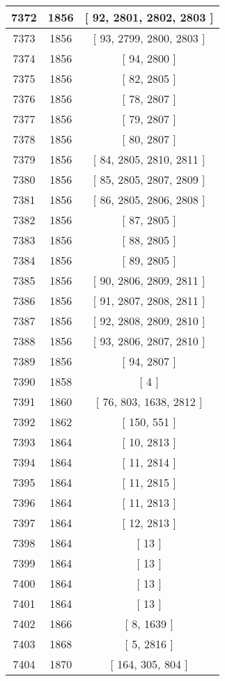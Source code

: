 \begin{center}
\begin{longtable}[H]{|| c c c ||}
\hline
7372 & 1856 & [ 92, 2801, 2802, 2803 ] \\ 
\hline
7373 & 1856 & [ 93, 2799, 2800, 2803 ] \\ 
\hline
7374 & 1856 & [ 94, 2800 ] \\ 
\hline
7375 & 1856 & [ 82, 2805 ] \\ 
\hline
7376 & 1856 & [ 78, 2807 ] \\ 
\hline
7377 & 1856 & [ 79, 2807 ] \\ 
\hline
7378 & 1856 & [ 80, 2807 ] \\ 
\hline
7379 & 1856 & [ 84, 2805, 2810, 2811 ] \\ 
\hline
7380 & 1856 & [ 85, 2805, 2807, 2809 ] \\ 
\hline
7381 & 1856 & [ 86, 2805, 2806, 2808 ] \\ 
\hline
7382 & 1856 & [ 87, 2805 ] \\ 
\hline
7383 & 1856 & [ 88, 2805 ] \\ 
\hline
7384 & 1856 & [ 89, 2805 ] \\ 
\hline
7385 & 1856 & [ 90, 2806, 2809, 2811 ] \\ 
\hline
7386 & 1856 & [ 91, 2807, 2808, 2811 ] \\ 
\hline
7387 & 1856 & [ 92, 2808, 2809, 2810 ] \\ 
\hline
7388 & 1856 & [ 93, 2806, 2807, 2810 ] \\ 
\hline
7389 & 1856 & [ 94, 2807 ] \\ 
\hline
7390 & 1858 & [ 4 ] \\ 
\hline
7391 & 1860 & [ 76, 803, 1638, 2812 ] \\ 
\hline
7392 & 1862 & [ 150, 551 ] \\ 
\hline
7393 & 1864 & [ 10, 2813 ] \\ 
\hline
7394 & 1864 & [ 11, 2814 ] \\ 
\hline
7395 & 1864 & [ 11, 2815 ] \\ 
\hline
7396 & 1864 & [ 11, 2813 ] \\ 
\hline
7397 & 1864 & [ 12, 2813 ] \\ 
\hline
7398 & 1864 & [ 13 ] \\ 
\hline
7399 & 1864 & [ 13 ] \\ 
\hline
7400 & 1864 & [ 13 ] \\ 
\hline
7401 & 1864 & [ 13 ] \\ 
\hline
7402 & 1866 & [ 8, 1639 ] \\ 
\hline
7403 & 1868 & [ 5, 2816 ] \\ 
\hline
7404 & 1870 & [ 164, 305, 804 ] \\ 

\end{longtable}
\end{center}
